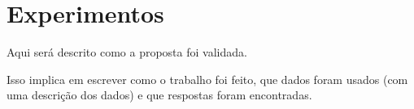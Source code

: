 \section{Experimentos}

Aqui será descrito como a proposta foi validada.

Isso implica em escrever como o trabalho foi feito, que dados foram usados (com uma descrição dos dados) e que respostas foram encontradas.

